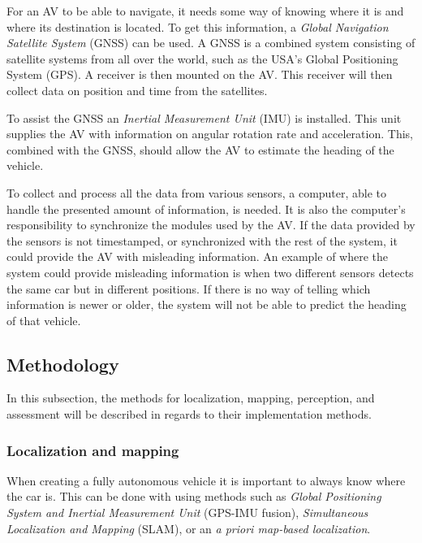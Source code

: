 For an AV to be able to navigate, it needs some way of knowing where it is and where its destination is located.
To get this information, a \textit{Global Navigation Satellite System} (GNSS) can be used.
A GNSS is a combined system consisting of satellite systems from all over the world, such as the USA’s Global Positioning System (GPS).
A receiver is then mounted on the AV.
This receiver will then collect data on position and time from the satellites.
\cite{what_is_gnss}

To assist the GNSS an \textit{Inertial Measurement Unit} (IMU) is installed.
This unit supplies the AV with information on angular rotation rate and acceleration.
This, combined with the GNSS, should allow the AV to estimate the heading of the vehicle.
\cite{charles_pao_imu, university_of_toronto_self-driving_vehicle}

To collect and process all the data from various sensors, a computer, able to handle the presented amount of information, is needed.
It is also the computer's responsibility to synchronize the modules used by the AV.
If the data provided by the sensors is not timestamped, or synchronized with the rest of the system, it could provide the AV with misleading information.
An example of where the system could provide misleading information is when two different sensors detects the same car but in different positions.
If there is no way of telling which information is newer or older, the system will not be able to predict the heading of that vehicle.
\cite{charles_pao_imu, university_of_toronto_self-driving_vehicle}


\subsection{Methodology}\label{probana:state-of-the-art:methodology}
In this subsection, the methods for localization, mapping, perception, and assessment will be described in regards to their implementation methods.

\subsubsection{Localization and mapping}
When creating a fully autonomous vehicle it is important to always know where the car is.
This can be done with using methods such as \textit{Global Positioning System and Inertial Measurement Unit} (GPS-IMU fusion), \textit{Simultaneous Localization and Mapping} (SLAM), or an \textit{a priori map-based localization}.

